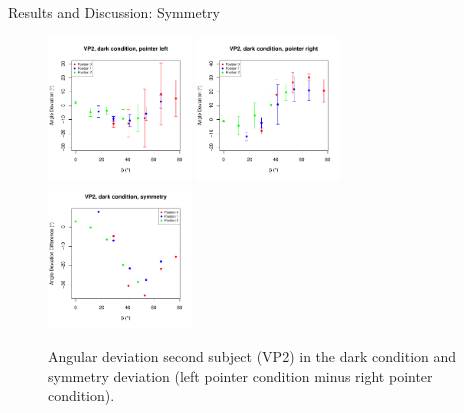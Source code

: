 \documentclass{beamer}
\begin{document}
\begin{frame}{Results and Discussion: Symmetry}
    \begin{minipage}{10cm}
        \begin{figure}
            \centering
            \includegraphics[clip, trim = 0cm 0.5cm 0.5cm 0.6cm, width = 3.8cm]{Images/plots/AngleDevVP2DarkLeft.pdf}
            \includegraphics[clip, trim = 0cm 0.5cm 0.5cm 0.6cm, width = 3.8cm]{Images/plots/AngleDevVP2DarkRight.pdf}
            \includegraphics[clip, trim = 0cm 0.5cm 0.5cm 0.6cm, width = 3.8cm]{Images/plots/VP2Symmetry.pdf}
            \caption{Angular deviation second subject (VP2) in the dark condition and symmetry deviation (left pointer condition minus right pointer condition).}
            \label{DevVP2}
        \end{figure}
    \end{minipage}
\end{frame}
\end{document}

